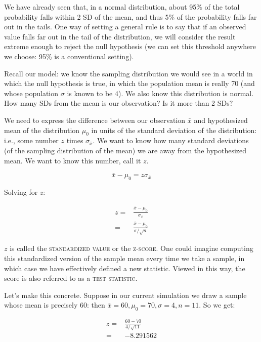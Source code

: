 \documentclass[12pt]{book}\usepackage[]{graphicx}\usepackage[]{color}
\begin{document}
We have already seen that, in a normal distribution, about 95\% of the total probability falls within 2 SD of the mean, and thus 5\% of the probability falls far out in the tails. One way of setting a general rule is to say that if an observed value falls far out in the tail of the distribution, we will consider the result extreme enough to reject the null hypothesis (we can set this threshold anywhere we choose: 95\% is a conventional setting).

Recall our model: we know the sampling distribution we would see in a world in which the null hypothesis is true, in which the population mean is really 70 (and whose population $\sigma$ is known to be 4). We also know this distribution is normal. How many SDs from the mean is our observation? Is it more than 2 SDs?

We need to express the difference between our observation $\bar{x}$ and hypothesized mean of the distribution $\mu_0$ in units of the standard deviation of the distribution: i.e., some number $z$ times
$\sigma_{\bar{x}}$. 
We want to know how many standard deviations (of the sampling distribution of the mean) we are away from the hypothesized mean. 
We want to know this number, call it $z$.

\begin{equation}
\bar{x} - \mu_0 =  z \sigma_{\bar{x}} 
\end{equation}

Solving for $z$:

\begin{align}
z = & \frac{\bar{x} - \mu_0}{\sigma_{\bar{x}}} \\ 
  = & \frac{\bar{x} - \mu_0}{\sigma/\sqrt{n}} 
\end{align}

$z$ is called the \textsc{standardized value} or the \textsc{z-score}. One could imagine computing this standardized version of the sample mean every time we take a sample, in which case we have effectively defined a new statistic. Viewed in this way, the score is also referred to as a \textsc{test statistic}.


Let's make this concrete. Suppose in our current simulation we draw a sample whose mean is precisely 60: then $\bar{x} =  
60, \mu_0 = 70, 
\sigma = 4, n = 11$. So we get:


\begin{align}
z = & \frac{60 - 70}{4/\sqrt{11}} \\
  = & -8.291562
\end{align}
\end{document}
